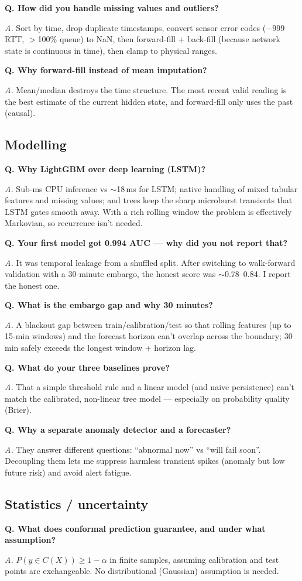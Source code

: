 \documentclass[11pt,a4paper]{article}
\newcommand{\Q}[1]{\vspace{4pt}\noindent\textbf{Q. #1}\par\nopagebreak}
\newcommand{\A}[1]{\noindent\textit{A.} #1\par}
\begin{document}
\Q{How did you handle missing values and outliers?}
\A{Sort by time, drop duplicate timestamps, convert sensor error codes ($-999$ RTT, $>$100\% queue) to NaN,
then forward-fill + back-fill (because network state is continuous in time), then clamp to physical ranges.}

\Q{Why forward-fill instead of mean imputation?}
\A{Mean/median destroys the time structure. The most recent valid reading is the best estimate of the current
hidden state, and forward-fill only uses the past (causal).}

\subsection{Modelling}
\Q{Why LightGBM over deep learning (LSTM)?}
\A{Sub-ms CPU inference vs $\sim$18\,ms for LSTM; native handling of mixed tabular features and missing values;
and trees keep the sharp microburst transients that LSTM gates smooth away. With a rich rolling window the
problem is effectively Markovian, so recurrence isn't needed.}

\Q{Your first model got 0.994 AUC --- why did you not report that?}
\A{It was temporal leakage from a shuffled split. After switching to walk-forward validation with a 30-minute
embargo, the honest score was $\sim$0.78--0.84. I report the honest one.}

\Q{What is the embargo gap and why 30 minutes?}
\A{A blackout gap between train/calibration/test so that rolling features (up to 15-min windows) and the
forecast horizon can't overlap across the boundary; 30 min safely exceeds the longest window + horizon lag.}

\Q{What do your three baselines prove?}
\A{That a simple threshold rule and a linear model (and naive persistence) can't match the calibrated,
non-linear tree model --- especially on probability quality (Brier).}

\Q{Why a separate anomaly detector and a forecaster?}
\A{They answer different questions: ``abnormal now'' vs ``will fail soon''. Decoupling them lets me suppress
harmless transient spikes (anomaly but low future risk) and avoid alert fatigue.}

\subsection{Statistics / uncertainty}
\Q{What does conformal prediction guarantee, and under what assumption?}
\A{$P(y\in C(X))\geq 1-\alpha$ in finite samples, assuming calibration and test points are exchangeable. No
distributional (Gaussian) assumption is needed.}
\end{document}
